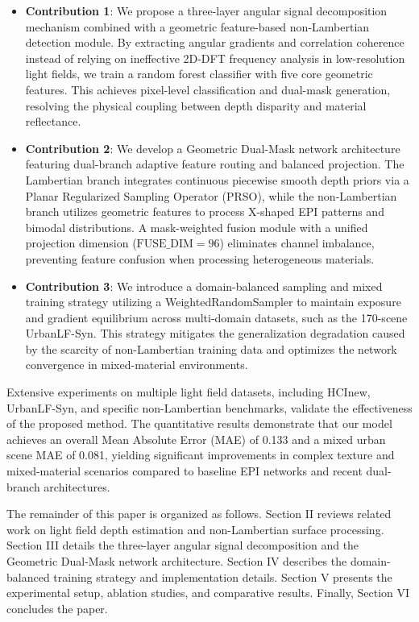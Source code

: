 \documentclass[lettersize,journal]{IEEEtran}
\begin{document}
\begin{itemize}
\item \textbf{Contribution 1}: We propose a three-layer angular signal decomposition mechanism combined with a geometric feature-based non-Lambertian detection module. By extracting angular gradients and correlation coherence instead of relying on ineffective 2D-DFT frequency analysis in low-resolution light fields, we train a random forest classifier with five core geometric features. This achieves pixel-level classification and dual-mask generation, resolving the physical coupling between depth disparity and material reflectance.
\item \textbf{Contribution 2}: We develop a Geometric Dual-Mask network architecture featuring dual-branch adaptive feature routing and balanced projection. The Lambertian branch integrates continuous piecewise smooth depth priors via a Planar Regularized Sampling Operator (PRSO), while the non-Lambertian branch utilizes geometric features to process X-shaped EPI patterns and bimodal distributions. A mask-weighted fusion module with a unified projection dimension ($\text{FUSE\_DIM}=96$) eliminates channel imbalance, preventing feature confusion when processing heterogeneous materials.
\item \textbf{Contribution 3}: We introduce a domain-balanced sampling and mixed training strategy utilizing a WeightedRandomSampler to maintain exposure and gradient equilibrium across multi-domain datasets, such as the 170-scene UrbanLF-Syn. This strategy mitigates the generalization degradation caused by the scarcity of non-Lambertian training data and optimizes the network convergence in mixed-material environments.
\end{itemize}

Extensive experiments on multiple light field datasets, including HCInew, UrbanLF-Syn, and specific non-Lambertian benchmarks, validate the effectiveness of the proposed method. The quantitative results demonstrate that our model achieves an overall Mean Absolute Error (MAE) of 0.133 and a mixed urban scene MAE of 0.081, yielding significant improvements in complex texture and mixed-material scenarios compared to baseline EPI networks and recent dual-branch architectures.

The remainder of this paper is organized as follows. Section II reviews related work on light field depth estimation and non-Lambertian surface processing. Section III details the three-layer angular signal decomposition and the Geometric Dual-Mask network architecture. Section IV describes the domain-balanced training strategy and implementation details. Section V presents the experimental setup, ablation studies, and comparative results. Finally, Section VI concludes the paper.
\end{document}
